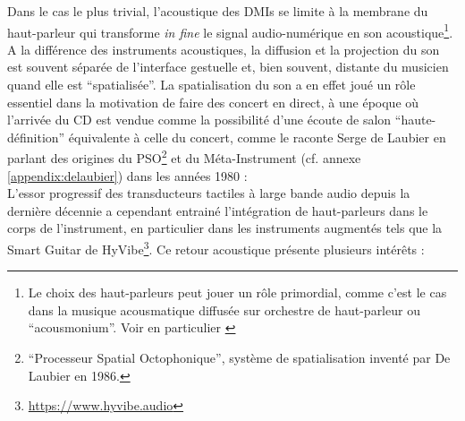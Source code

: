 \noindent Dans le cas le plus trivial, l'acoustique des \glspl{DMI} se limite à la membrane du haut-parleur qui transforme \textit{in fine} le signal audio-numérique en son acoustique\footnote{Le choix des haut-parleurs peut jouer un rôle primordial, comme c'est le cas dans la musique acousmatique diffusée sur orchestre de haut-parleur ou ``acousmonium''. Voir en particulier \cite{mooney_sound_2006}}. A la différence des instruments acoustiques, la diffusion et la projection du son est souvent séparée de l'interface gestuelle et, bien souvent, distante du musicien quand elle est ``spatialisée''. La spatialisation du son a en effet joué un rôle essentiel dans la motivation de faire des concert en direct, à une époque où l'arrivée du \gls{CD} est vendue comme la possibilité d'une écoute de salon ``haute-définition'' équivalente à celle du concert, comme le raconte Serge de Laubier en parlant des origines du PSO\footnote{``Processeur Spatial Octophonique'', système de spatialisation inventé par De Laubier en 1986.} et du Méta-Instrument (cf. annexe \ref{appendix:delaubier}) dans les années 1980 : \\
\indent L'essor progressif des transducteurs tactiles à large bande audio depuis la dernière décennie a cependant entrainé l'intégration de haut-parleurs dans le corps de l'instrument, en particulier dans les instruments augmentés tels que la Smart Guitar de HyVibe\footnote{\url{https://www.hyvibe.audio}}. Ce retour acoustique présente plusieurs intérêts :
\vspace{-1em}
